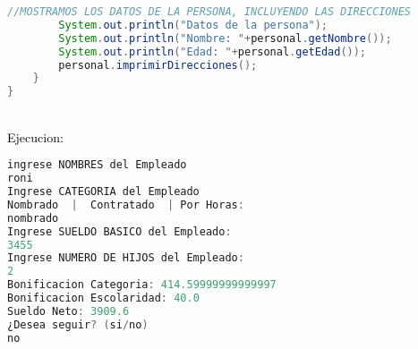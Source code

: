 \documentclass{article}
\begin{document}
\begin{itemize}
\begin{itemize}
\begin{lstlisting}[language=java]
        //MOSTRAMOS LOS DATOS DE LA PERSONA, INCLUYENDO LAS DIRECCIONES
        System.out.println("Datos de la persona");
        System.out.println("Nombre: "+personal.getNombre());
        System.out.println("Edad: "+personal.getEdad());
        personal.imprimirDirecciones();
    } 
}
        \end{lstlisting}
        \newline
        \\
        \textcolor{black}{Ejecucion:} 
		\begin{lstlisting}[language=java]
ingrese NOMBRES del Empleado
roni
Ingrese CATEGORIA del Empleado
Nombrado  |  Contratado  | Por Horas:
nombrado
Ingrese SUELDO BASICO del Empleado:
3455
Ingrese NUMERO DE HIJOS del Empleado:
2
Bonificacion Categoria: 414.59999999999997
Bonificacion Escolaridad: 40.0
Sueldo Neto: 3909.6
¿Desea seguir? (si/no)
no


\end{lstlisting}
\end{itemize}
\end{itemize}
\end{document}
